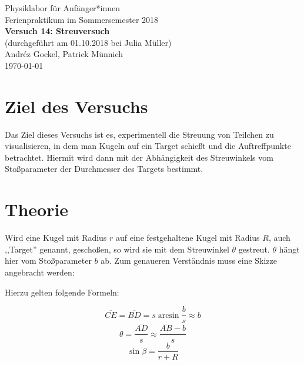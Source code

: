 \documentclass[11pt,a4paper]{article}
\begin{document}
{
\centering 
\large 
Physiklabor für Anf\"anger*innen \\
Ferienpraktikum im Sommersemester 2018 \\[4mm]
\textbf{\LARGE 
Versuch 14: Streuversuch
} \\[3mm]
(durchgef\"uhrt am 01.10.2018 bei Julia M\"uller) \\
Andréz Gockel, Patrick M\"unnich\\
\today \\[10mm]
}

\vspace{50pt}
\tableofcontents
\vspace{22pt}
\listoftables
\vspace{22pt}
\listoffigures
\pagebreak

\phantom{lol}
\thispagestyle{empty}
\pagebreak

\section{Ziel des Versuchs}

Das Ziel dieses Versuchs ist es, experimentell die Streuung von Teilchen zu visualisieren, in dem man Kugeln auf ein Target schie\ss t und die Auftreffpunkte betrachtet. Hiermit wird dann mit der Abh\"angigkeit des Streuwinkels vom Sto\ss parameter der Durchmesser des Targets bestimmt.

\section{Theorie}

Wird eine Kugel mit Radius $r$ auf eine festgehaltene Kugel mit Radius $R$, auch ,,Target'' genannt, gescho\ss en, so wird sie mit dem Streuwinkel $\theta$ gestreut. $\theta$ h\"angt hier vom Sto\ss parameter $b$ ab. Zum genaueren Verst\"andnis muss eine Skizze angebracht werden:


Hierzu gelten folgende Formeln:


\begin{equation}
\overline{CE}=\overline{BD}=s\arcsin\frac{b}{s}\approx b\label{eq:1}
\end{equation}
\begin{equation}
\theta=\frac{\overline{AD}}{s}\approx\frac{\overline{AB}-b}{s}\label{eq:2}
\end{equation}
\begin{equation}
\sin\beta=\frac{b}{r+R}\label{eq:3}
\end{equation}
\end{document}
